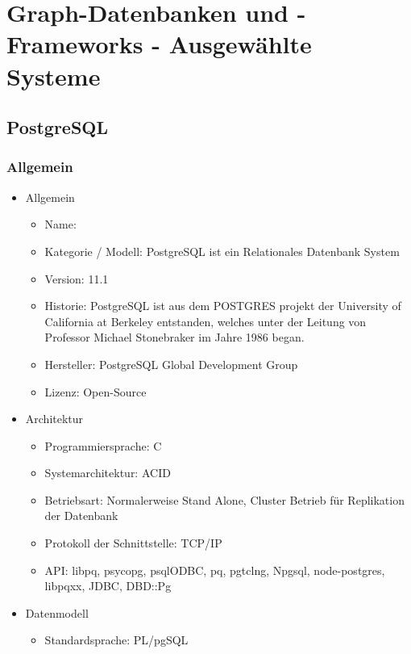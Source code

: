 \chapter{Graph-Datenbanken und -Frameworks - Ausgewählte Systeme }
\section{PostgreSQL}
\subsection{Allgemein}
    \begin{itemize}
        \item Allgemein
        \begin{itemize}
            \item Name:
            \item Kategorie / Modell: PostgreSQL ist ein Relationales Datenbank System \cite{postgresqldoc}
            \item Version: 11.1
            \item Historie: PostgreSQL ist aus dem POSTGRES projekt der University of California at Berkeley entstanden, welches unter der Leitung von  Professor Michael Stonebraker im Jahre 1986 began.
            \item Hersteller: PostgreSQL Global Development Group
            \item Lizenz: Open-Source
        \end{itemize}
        \item Architektur
        \begin{itemize}
            \item Programmiersprache: C
            \item Systemarchitektur: ACID
            \item Betriebsart: Normalerweise Stand Alone, Cluster Betrieb für Replikation der Datenbank
            \item Protokoll der Schnittstelle: TCP/IP \cite[Seite 28]{froehlich01}
            \item API: libpq, psycopg, psqlODBC, pq, pgtclng, Npgsql, node-postgres, libpqxx, JDBC, DBD::Pg \cite{postgres2018}
        \end{itemize}
        \item Datenmodell
        \begin{itemize}
            \item Standardsprache: PL/pgSQL \cite[Seite 270]{froehlich01}

\end{itemize}
\end{itemize}
